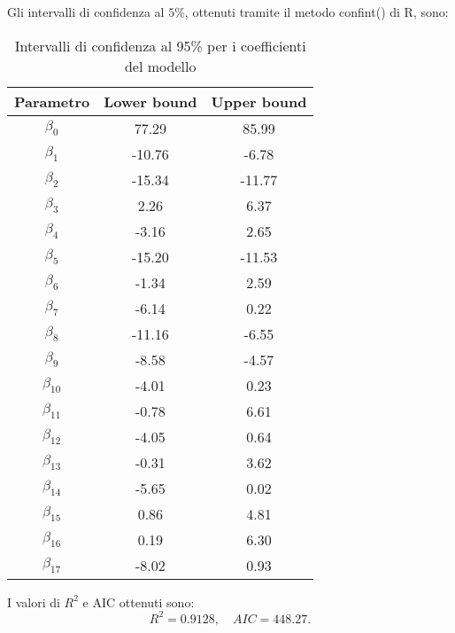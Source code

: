 Gli intervalli di confidenza al $5\%$, ottenuti tramite il metodo confint() di R, sono:
\begin{table}[H]
	\centering
	\begin{tabular}{|c|c|c|}
		\hline
		\textbf{Parametro} & \textbf{Lower bound} & \textbf{Upper bound} \\
		\hline
		$\beta_0$   & 77.29  & 85.99 \\
		$\beta_1$   & -10.76 & -6.78 \\
		$\beta_2$   & -15.34 & -11.77 \\
		$\beta_3$   & 2.26   & 6.37 \\
		$\beta_4$   & -3.16  & 2.65 \\
		$\beta_5$   & -15.20 & -11.53 \\
		$\beta_6$   & -1.34  & 2.59 \\
		$\beta_7$   & -6.14  & 0.22 \\
		$\beta_8$   & -11.16 & -6.55 \\
		$\beta_9$   & -8.58  & -4.57 \\
		$\beta_{10}$ & -4.01  & 0.23 \\
		$\beta_{11}$ & -0.78  & 6.61 \\
		$\beta_{12}$ & -4.05  & 0.64 \\
		$\beta_{13}$ & -0.31  & 3.62 \\
		$\beta_{14}$ & -5.65  & 0.02 \\
		$\beta_{15}$ & 0.86   & 4.81 \\
		$\beta_{16}$ & 0.19   & 6.30 \\
		$\beta_{17}$ & -8.02  & 0.93 \\
		\hline
	\end{tabular}
	\caption{Intervalli di confidenza al 95\% per i coefficienti del modello}
	\label{tab:ci_coefficienti}
\end{table}
I valori di $R^2$ e AIC ottenuti sono:
\begin{equation*}
	R^2 =     0.9128, \quad AIC=448.27.
\end{equation*}


